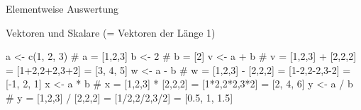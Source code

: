 \documentclass[
  8pt,
  ignorenonframetext,
]{beamer}
\newenvironment{Shaded}{\begin{snugshade}}{\end{snugshade}}
\newcommand{\CommentTok}[1]{\textcolor[rgb]{0.37,0.37,0.37}{#1}}
\newcommand{\DecValTok}[1]{\textcolor[rgb]{0.68,0.00,0.00}{#1}}
\newcommand{\FunctionTok}[1]{\textcolor[rgb]{0.28,0.35,0.67}{#1}}
\newcommand{\NormalTok}[1]{\textcolor[rgb]{0.00,0.23,0.31}{#1}}
\newcommand{\OtherTok}[1]{\textcolor[rgb]{0.00,0.23,0.31}{#1}}
\newcommand{\SpecialCharTok}[1]{\textcolor[rgb]{0.37,0.37,0.37}{#1}}
\begin{document}
\begin{frame}[fragile]{Elementweise Auswertung}
\footnotesize

Vektoren und Skalare (= Vektoren der Länge 1)

\begin{Shaded}
\begin{Highlighting}[]
\NormalTok{a }\OtherTok{\textless{}{-}} \FunctionTok{c}\NormalTok{(}\DecValTok{1}\NormalTok{, }\DecValTok{2}\NormalTok{, }\DecValTok{3}\NormalTok{)        }\CommentTok{\# a = [1,2,3]}
\NormalTok{b }\OtherTok{\textless{}{-}} \DecValTok{2}                 \CommentTok{\# b = [2]}
\NormalTok{v }\OtherTok{\textless{}{-}}\NormalTok{ a }\SpecialCharTok{+}\NormalTok{ b             }\CommentTok{\# v = [1,2,3] + [2,2,2] = [1+2,2+2,3+2] = [3, 4, 5]}
\NormalTok{w }\OtherTok{\textless{}{-}}\NormalTok{ a }\SpecialCharTok{{-}}\NormalTok{ b             }\CommentTok{\# w = [1,2,3] {-} [2,2,2] = [1{-}2,2{-}2,3{-}2] = [{-}1, 2, 1]}
\NormalTok{x }\OtherTok{\textless{}{-}}\NormalTok{ a }\SpecialCharTok{*}\NormalTok{ b             }\CommentTok{\# x = [1,2,3] * [2,2,2] = [1*2,2*2,3*2] = [2, 4, 6]}
\NormalTok{y }\OtherTok{\textless{}{-}}\NormalTok{ a }\SpecialCharTok{/}\NormalTok{ b             }\CommentTok{\# y = [1,2,3] / [2,2,2] = [1/2,2/2,3/2] = [0.5, 1, 1.5]}
\end{Highlighting}
\end{Shaded}
\end{frame}
\end{document}
